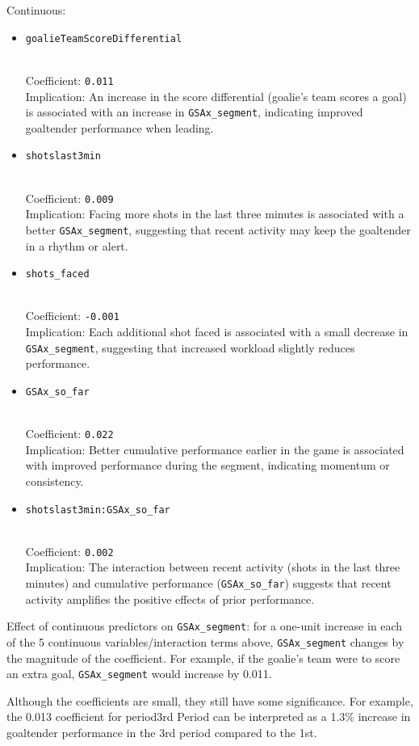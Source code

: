 \documentclass[
  letterpaper,
  DIV=11,
  numbers=noendperiod]{scrartcl}
\begin{document}
Continuous:

\begin{itemize}
\item
  \texttt{goalieTeamScoreDifferential}\strut \\
  Coefficient: \texttt{0.011}\\
  Implication: An increase in the score differential (goalie's team
  scores a goal) is associated with an increase in
  \texttt{GSAx\_segment}, indicating improved goaltender performance
  when leading.
\item
  \texttt{shotslast3min}\strut \\
  Coefficient: \texttt{0.009}\\
  Implication: Facing more shots in the last three minutes is associated
  with a better \texttt{GSAx\_segment}, suggesting that recent activity
  may keep the goaltender in a rhythm or alert.
\item
  \texttt{shots\_faced}\strut \\
  Coefficient: \texttt{-0.001}\\
  Implication: Each additional shot faced is associated with a small
  decrease in \texttt{GSAx\_segment}, suggesting that increased workload
  slightly reduces performance.
\item
  \texttt{GSAx\_so\_far}\strut \\
  Coefficient: \texttt{0.022}\\
  Implication: Better cumulative performance earlier in the game is
  associated with improved performance during the segment, indicating
  momentum or consistency.
\item
  \texttt{shotslast3min:GSAx\_so\_far}\strut \\
  Coefficient: \texttt{0.002}\\
  Implication: The interaction between recent activity (shots in the
  last three minutes) and cumulative performance
  (\texttt{GSAx\_so\_far}) suggests that recent activity amplifies the
  positive effects of prior performance.
\end{itemize}

Effect of continuous predictors on \texttt{GSAx\_segment}: for a
one-unit increase in each of the 5 continuous variables/interaction
terms above, \texttt{GSAx\_segment} changes by the magnitude of the
coefficient. For example, if the goalie's team were to score an extra
goal, \texttt{GSAx\_segment} would increase by 0.011.

Although the coefficients are small, they still have some significance.
For example, the 0.013 coefficient for period3rd Period can be
interpreted as a 1.3\% increase in goaltender performance in the 3rd
period compared to the 1st.
\end{document}
